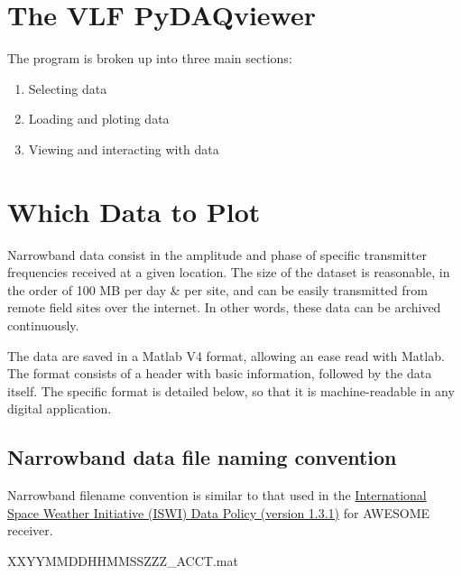 \documentclass[%
oneside,                 %
final,                   %
10pt]{article}
\begin{document}
\tableofcontents


\vspace{1cm} %




\section{The VLF PyDAQviewer}
The program is broken up into three main sections:

\begin{enumerate}
\item Selecting data

\item Loading and ploting data

\item Viewing and interacting with data
\end{enumerate}

\noindent
\section{Which Data to Plot}
Narrowband data consist in the amplitude and phase of specific transmitter frequencies received at a given location. The size of the dataset is reasonable, in the order of 100 MB per day {\&} per site, and can be easily transmitted from remote field sites over the internet. In other words, these data can be archived continuously.

The data are saved in a Matlab V4 format, allowing an ease read with Matlab. The format consists of a header with basic information, followed by the data itself. The specific format is detailed below, so that it is machine-readable in any digital application.

\subsection{Narrowband data file naming convention}
Narrowband filename convention is similar to that used in the \href{{http://newserver.stil.bas.bg/ISWI/PDFsJ/ISWI_DataPolicy_1.3.1_final.pdf}}{International Space Weather Initiative (ISWI) Data Policy (version 1.3.1)} for AWESOME receiver.

XXYYMMDDHHMMSSZZZ_ACCT.mat
\end{document}

